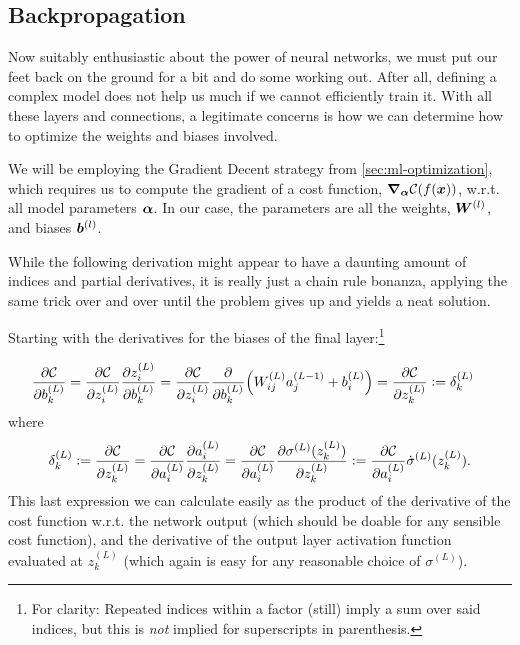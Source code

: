\documentclass[Thesis.tex]{subfiles}
\begin{document}
\subsection{Backpropagation}

Now suitably enthusiastic about the power of neural networks, we must put our
feet back on the ground for a bit and do some working out. After all, defining a
complex model does not help us much if we cannot efficiently train it. With all
these layers and connections, a legitimate concerns is how we can determine how
to optimize the weights and biases involved.

We will be employing the Gradient Decent strategy from \cref{sec:ml-optimization},
which requires us to compute the gradient of a cost function,
$\grad_{\bm{\alpha}}\mathcal{C}(f(\bm{x}))$, w.r.t. all model parameters $\bm{\alpha}$. In
our case, the parameters are all the weights, $\bm{W}^{(l)}$, and biases $\bm{b}^{(l)}$.

While the following derivation might appear to have a daunting amount of indices
and partial derivatives, it is really just a chain rule bonanza, applying the
same trick over and over until the problem gives up and yields a neat
solution.

Starting with the derivatives for the biases of the final layer:\footnote{For
  clarity: Repeated indices within a factor (still) imply a sum over said
  indices, but this is \emph{not} implied for superscripts in parenthesis.}

\begin{align}
  \pdv{\mathcal{C}}{b_k^{(L)}} &=
\pdv{\mathcal{C}}{z_i^{(L)}}\pdv{z_i^{(L)}}{b_k^{(L)}}
=\pdv{\mathcal{C}}{z_i^{(L)}}\pdv{}{b_k^{(L)}}\qty(W_{ij}^{(L)}a_j^{(L-1)} +
b_i^{(L)}) = \pdv{\mathcal{C}}{z_k^{(L)}}\vcentcolon= \delta_k^{(L)}
\end{align}
where
\begin{align}
  \delta_k^{(L)}\vcentcolon= \pdv{\mathcal{C}}{z_k^{(L)}} =
\pdv{\mathcal{C}}{a^{(L)}_{i}}\pdv{a_i^{(L)}}{z_k^{(L)}} =
\pdv{\mathcal{C}}{a^{(L)}_{i}}\pdv{\sigma^{(L)}(z_k^{(L)})}{z_k^{(L)}} \vcentcolon= 
\pdv{\mathcal{C}}{a^{(L)}_{i}}\dot\sigma^{(L)}(z_k^{(L)}).
\end{align}
This last expression we can calculate easily as the product of the derivative of
the cost function w.r.t. the network output (which should be doable for any
sensible cost function), and the derivative of the output layer activation
function evaluated at $z_k^{(L)}$ (which again is easy for any reasonable choice
of $\sigma^{(L)}$).
\end{document}
